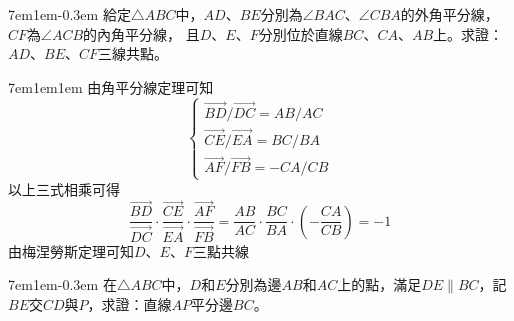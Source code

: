 \documentclass[12pt]{article}
\begin{document}
\begin{mybox}[Problem 6]{7em}{1em}{-0.3em}
   給定$\triangle{ABC}$中，$AD$、$BE$分別為$\angle{BAC}$、$\angle{CBA}$的外角平分線，$CF$為$\angle{ACB}$的內角平分線，
   且$D$、$E$、$F$分別位於直線$BC$、$CA$、$AB$上。求證：$AD$、$BE$、$CF$三線共點。
\end{mybox}
\begin{mybox}[Answer 6]{7em}{1em}{1em}
    由角平分線定理可知
    $$
        \begin{cases}
            \overrightarrow{BD}/\overrightarrow{DC}=AB/AC\\
            \overrightarrow{CE}/\overrightarrow{EA}=BC/BA\\
             \overrightarrow{AF}/\overrightarrow{FB}=-CA/CB
        \end{cases}
    $$
    以上三式相乘可得
    $$
        \frac{\overrightarrow{BD}}{\overrightarrow{DC}}
        \cdot\frac{\overrightarrow{CE}}{\overrightarrow{EA}}
        \cdot\frac{\overrightarrow{AF}}{\overrightarrow{FB}} = 
        \frac{AB}{AC}\cdot\frac{BC}{BA}
        \cdot\left(-\frac{CA}{CB}\right)=-1
    $$
    由梅涅勞斯定理可知$D$、$E$、$F$三點共線    
\end{mybox}
\begin{mybox}[Problem 7]{7em}{1em}{-0.3em}
   在$\triangle{ABC}$中，$D$和$E$分別為邊$AB$和$AC$上的點，滿足$DE\parallel BC$，記$BE$交$CD$與$P$，求證：直線$AP$平分邊$BC$。
\end{mybox}
\end{document}
